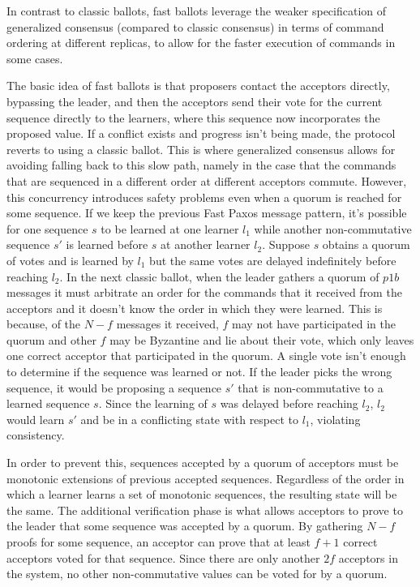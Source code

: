In contrast to classic ballots, fast ballots leverage the weaker specification of generalized consensus (compared to classic consensus) in terms of command ordering at different replicas, to allow for the faster execution of commands in some cases.\par
The basic idea of fast ballots is that proposers contact the acceptors directly, bypassing the leader, and then the acceptors send their vote for the current sequence directly to the learners, where this sequence now incorporates the proposed value. If a conflict exists and progress isn't being made, the protocol reverts to using a classic ballot. This is where generalized consensus allows for avoiding falling back to this slow path, namely in the case that the commands that are sequenced in a different order at different acceptors commute. However, this concurrency introduces safety problems even when a quorum is reached for some sequence. If we keep the previous Fast Paxos message pattern, it's possible for one sequence $s$ to be learned at one learner $l_1$ while another non-commutative sequence $s'$ is learned before $s$ at another learner $l_2$. Suppose $s$ obtains a quorum of votes and is learned by $l_1$ but the same votes are delayed indefinitely before reaching $l_2$. In the next classic ballot, when the leader gathers a quorum of $p1b$ messages it must arbitrate an order for the commands that it received from the acceptors and it doesn't know the order in which they were learned. This is because, of the $N-f$ messages it received, $f$ may not have participated in the quorum and other $f$ may be Byzantine and lie about their vote, which only leaves one correct acceptor that participated in the quorum. A single vote isn't enough to determine if the sequence was learned or not. If the leader picks the wrong sequence, it would be proposing a sequence $s'$ that is non-commutative to a learned sequence $s$. Since the learning of $s$ was delayed before reaching $l_2$, $l_2$ would learn $s'$ and be in a conflicting state with respect to $l_1$, violating consistency. {\color{red}In order to prevent this, sequences accepted by a quorum of acceptors must be monotonic extensions of previous accepted sequences. Regardless of the order in which a learner learns a set of monotonic sequences, the resulting state will be the same. The additional verification phase is what allows acceptors to prove to the leader that some sequence was accepted by a quorum. By gathering $N-f$ proofs for some sequence, an acceptor can prove that at least $f+1$ correct acceptors voted for that sequence. Since there are only another $2f$ acceptors in the system, no other non-commutative values can be voted for by a quorum. \par
}
